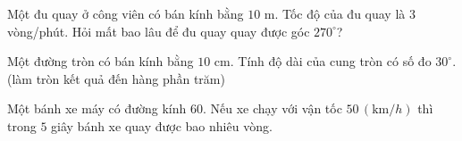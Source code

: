 
\begin{ex}%
	Một đu quay ở công viên có bán kính bằng $10$ m. Tốc độ  của đu quay là $3$ vòng/phút. Hỏi mất bao lâu để đu quay quay được góc $270^{\circ}$?
\end{ex}

\begin{ex}%
	Một đường tròn có bán kính bằng $10$ cm. Tính độ dài của cung tròn có  số đo $30^{\circ}$. (làm tròn kết quả đến hàng phần trăm)
\end{ex}

\begin{ex}%
	 Một bánh xe máy có đường kính $60$. Nếu xe chạy với vận tốc $50\,(\mathrm{km}/h)$ thì trong $5$ giây bánh xe quay được bao nhiêu vòng.
\end{ex}

